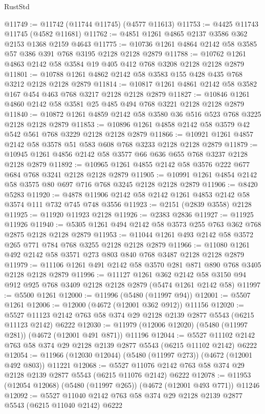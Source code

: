 \begin{lexlean}{RustStd}
\begin{coremodule}
{\begin{coremodule}
{{{{{{{{{{{{{{{{@11749 := @11742 (@11744 @11745) (@4577 @11613)
@11753 := @4425 @11743 @11745 (@4582 @11681)
@11762 := @4851 @1261 @4865 @2137 @3586 @362 @2153 @1368 @2159 @4643
@11775 := @10736 @1261 @4864 @2142 @58 @3585 @57 @386 @391 @768 @3195 @2128 @2128 @2879
@11788 := @10762 @1261 @4863 @2142 @58 @3584 @19 @405 @412 @768 @3208 @2128 @2128 @2879
@11801 := @10788 @1261 @4862 @2142 @58 @3583 @155 @428 @435 @768 @3212 @2128 @2128 @2879
@11814 := @10817 @1261 @4861 @2142 @58 @3582 @167 @454 @463 @768 @3217 @2128 @2128 @2879
@11827 := @10846 @1261 @4860 @2142 @58 @3581 @25 @485 @494 @768 @3221 @2128 @2128 @2879
@11840 := @10872 @1261 @4859 @2142 @58 @3580 @36 @516 @523 @768 @3225 @2128 @2128 @2879
@11853 := @10896 @1261 @4858 @2142 @58 @3579 @42 @542 @561 @768 @3229 @2128 @2128 @2879
@11866 := @10921 @1261 @4857 @2142 @58 @3578 @51 @583 @608 @768 @3233 @2128 @2128 @2879
@11879 := @10945 @1261 @4856 @2142 @58 @3577 @66 @636 @655 @768 @3237 @2128 @2128 @2879
@11892 := @10965 @1261 @4855 @2142 @58 @3576 @222 @677 @684 @768 @3241 @2128 @2128 @2879
@11905 := @10991 @1261 @4854 @2142 @58 @3575 @80 @697 @716 @768 @3245 @2128 @2128 @2879
@11906 := @8420 @5283
@11920 := @4878 @11906 @2142 @58 @2142 @1261 @4853 @2142 @58 @3574 @111 @732 @745 @748 @3556
@11923 := @2151 (@2839 @3558) @2128
@11925 := @11920 @11923 @2128
@11926 := @2383 @2836
@11927 := @11925 @11926
@11940 := @5305 @1261 @494 @2142 @58 @3573 @255 @763 @362 @768 @2875 @2128 @2128 @2879
@11953 := @11044 @1261 @493 @2142 @58 @3572 @265 @771 @784 @768 @3255 @2128 @2128 @2879
@11966 := @11080 @1261 @492 @2142 @58 @3571 @273 @803 @840 @768 @3487 @2128 @2128 @2879
@11979 := @11106 @1261 @491 @2142 @58 @3570 @281 @871 @890 @768 @3405 @2128 @2128 @2879
@11996 := @11127
    @1261
    @362
    @2142
    @58
    @3150
    @94
    @912
    @925
    @768
    @3409
    @2128
    @2128
    @2879
    (@5474 @1261 @2142 @58)
@11997 := @5500 @1261
@12000 := @11996 (@5480 (@11997 @94))
@12001 := @5507 @1261
@12006 := @12000 (@4672 (@12001 @362 @912)) @11156
@12020 := @5527 @11123 @2142 @763 @58 @374 @29 @2128 @2139 @2877 @5543 (@6215 @11123 @2142) @6222
@12030 := @11979 (@12006 @12020) (@5480 (@11997 @281)) (@4672 (@12001 @491 @871)) @11196
@12044 := @5527 @11102 @2142 @763 @58 @374 @29 @2128 @2139 @2877 @5543 (@6215 @11102 @2142) @6222
@12054 := @11966 (@12030 @12044) (@5480 (@11997 @273)) (@4672 (@12001 @492 @803)) @11221
@12068 := @5527 @11076 @2142 @763 @58 @374 @29 @2128 @2139 @2877 @5543 (@6215 @11076 @2142) @6222
@12078 := @11953 (@12054 @12068) (@5480 (@11997 @265)) (@4672 (@12001 @493 @771)) @11246
@12092 := @5527 @11040 @2142 @763 @58 @374 @29 @2128 @2139 @2877 @5543 (@6215 @11040 @2142) @6222
}}}}}}}}}}}}}}}}
\end{coremodule}}
\end{coremodule}
\end{lexlean}
